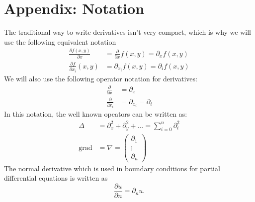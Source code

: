 %
% 
%
\section{Appendix: Notation}
The traditional way to write derivatives isn't very compact, which is why
we will use the following equivalent notation
\begin{align*}
\frac{\partial f(x,y)}{\partial x}
&=\frac{\partial}{\partial x}f(x,y)
=\partial_x f(x,y)\\
\frac{\partial f}{\partial x_i}(x,y)
&=\partial_{x_i}f(x,y)=\partial_if(x,y)
\end{align*}
We will also use the following operator notation for derivatives:
\begin{align*}
\frac{\partial}{\partial x}
&=
\partial_x\\
\frac{\partial}{\partial x_i}
&=
\partial_{x_i}
=\partial_i
\end{align*}
In this notation, the well known opeators can be written as:
\begin{align*}
\Delta &=\partial_x^2+\partial_y^2+\dots=\sum_{i=0}^n\partial_i^2\\
\operatorname{grad}&=\nabla=\begin{pmatrix}\partial_1\\\vdots\\\partial_n\end{pmatrix}
\end{align*}
The normal derivative which is used in boundary conditions for partial
differential equations is written as
\[
\frac{\partial u}{\partial n}=\partial_nu.
\]

